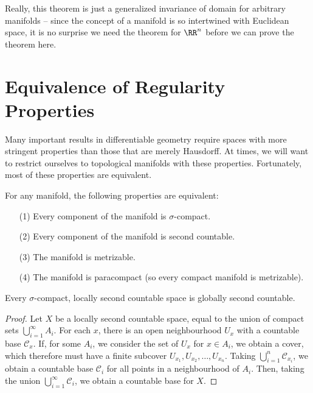 Really, this theorem is just a generalized invariance of domain for arbitrary manifolds -- since the concept of a manifold is so intertwined with Euclidean space, it is no surprise we need the theorem for $\RR^n$ before we can prove the theorem here.

\section{Equivalence of Regularity Properties}

Many important results in differentiable geometry require spaces with more stringent properties than those that are merely Hausdorff. At times, we will want to restrict ourselves to topological manifolds with these properties. Fortunately, most of these properties are equivalent.

\begin{theorem}
    For any manifold, the following properties are equivalent:
    \begin{enumerate}
        \item[(1)] Every component of the manifold is $\sigma$-compact.
        \item[(2)] Every component of the manifold is second countable.
        \item[(3)] The manifold is metrizable.
        \item[(4)] The manifold is paracompact (so every compact manifold is metrizable).
    \end{enumerate}
\end{theorem}

\begin{lemma}[$1) \to (2$]
    Every $\sigma$-compact, locally second countable space is globally second countable.
\end{lemma}
\begin{proof}
    Let $X$ be a locally second countable space, equal to the union of compact sets $\bigcup_{i = 1}^\infty A_i$. For each $x$, there is an open neighbourhood $U_x$ with a countable base $\mathcal{C}_x$. If, for some $A_i$, we consider the set of $U_x$ for $x \in A_i$, we obtain a cover, which therefore must have a finite subcover $U_{x_1}, U_{x_2}, \dots, U_{x_n}$. Taking $\bigcup_{i = 1}^n \mathcal{C}_{x_i}$, we obtain a countable base $\mathcal{C}_i$ for all points in a neighbourhood of $A_i$. Then, taking the union $\bigcup_{i = 1}^\infty \mathcal{C}_i$, we obtain a countable base for $X$.
\end{proof}

